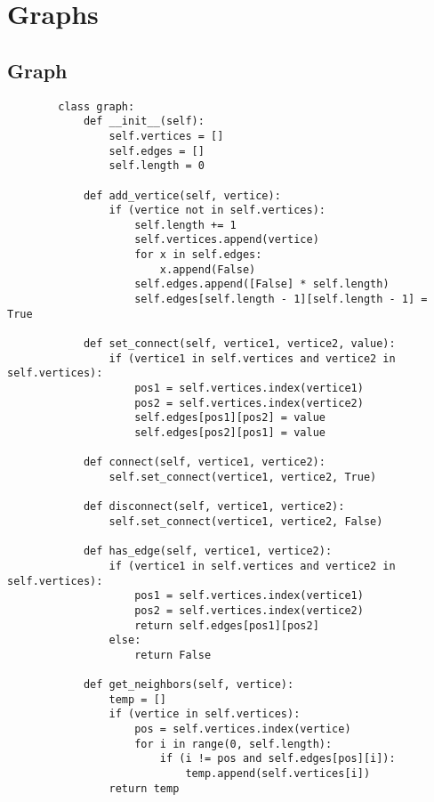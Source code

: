 \newpage

\section[Day 5: Graphs]{ Graphs }

\subsection{ Graph }

    \begin{lstlisting}
        class graph:
            def __init__(self):
                self.vertices = []
                self.edges = []
                self.length = 0

            def add_vertice(self, vertice):
                if (vertice not in self.vertices):
                    self.length += 1
                    self.vertices.append(vertice)
                    for x in self.edges:
                        x.append(False)
                    self.edges.append([False] * self.length)
                    self.edges[self.length - 1][self.length - 1] = True    
                            
            def set_connect(self, vertice1, vertice2, value):
                if (vertice1 in self.vertices and vertice2 in self.vertices):
                    pos1 = self.vertices.index(vertice1)
                    pos2 = self.vertices.index(vertice2)
                    self.edges[pos1][pos2] = value
                    self.edges[pos2][pos1] = value
                    
            def connect(self, vertice1, vertice2):
                self.set_connect(vertice1, vertice2, True)
                
            def disconnect(self, vertice1, vertice2):
                self.set_connect(vertice1, vertice2, False)
                
            def has_edge(self, vertice1, vertice2):
                if (vertice1 in self.vertices and vertice2 in self.vertices):
                    pos1 = self.vertices.index(vertice1)
                    pos2 = self.vertices.index(vertice2)
                    return self.edges[pos1][pos2] 
                else:
                    return False
                
            def get_neighbors(self, vertice):
                temp = []
                if (vertice in self.vertices):
                    pos = self.vertices.index(vertice)
                    for i in range(0, self.length):
                        if (i != pos and self.edges[pos][i]):
                            temp.append(self.vertices[i])
                return temp
    \end{lstlisting}

